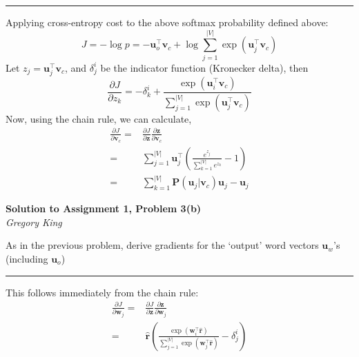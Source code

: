 \documentclass[letter,12pt]{article}
\newcommand{\myhwtitle}[3]
{\begin{center}
{\large {\bf Solution to Assignment {#1}, Problem {#2}}}\\
\medskip 
{\it {#3}} %
\end{center}}
\begin{document}
\noindent\rule{\textwidth}{0.4pt}\vspace{5mm}
Applying cross-entropy cost to the above softmax probability defined above:
\begin{equation}
J =-\log{p} = - {\boldsymbol u}_{o}^{\top}{\boldsymbol v}_{c} + \log\sum^{\vert{V}\vert}_{j=1}\exp{({\boldsymbol u}_{j}^{\top}{\boldsymbol v}_{c})}
\end{equation}
Let $z_{j}={\boldsymbol u}_{j}^{\top}{\boldsymbol v}_{c}$, and $\delta^{i}_{j}$ be the indicator function (Kronecker delta), then
\begin{equation}
\frac{\partial J}{\partial{z_{k}}} = - \delta^{i}_{k} + \frac{\exp{({\boldsymbol u}_{i}^{\top}{\boldsymbol v}_{c})}}{\sum^{\vert{V}\vert}_{j=1}\exp{({\boldsymbol u}_{j}^{\top}{\boldsymbol v}_{c})}}
\end{equation}
Now, using the chain rule, we can calculate,
\begin{align}
\frac{\partial J}{\partial{{\boldsymbol v}_{c}}} =&\frac{\partial J}{\partial{{\boldsymbol z}}}\frac{\partial{{\boldsymbol z}}}{\partial{{\boldsymbol v}_{c}}} \\
                                                                    =& \sum^{\vert{V}\vert}_{j=1}{\boldsymbol u}_{j}^{\top}\left(\frac{e^{z_{j}}}{\sum^{\vert{V}\vert}_{k=1}e^{z_{k}}} -  1\right) \\
                                                                    =&\sum^{\vert{V}\vert}_{k=1}{\boldsymbol P}({\boldsymbol u}_{j} \vert {\boldsymbol v}_{c} ){\boldsymbol u}_{j} - {\boldsymbol u}_{j}
\end{align}

\clearpage

\myhwtitle{1}{3(b)}{Gregory King}

\bigskip
\noindent As in the previous problem, derive gradients for the `output' word vectors ${\boldsymbol u}_{w}$'s (including ${\boldsymbol u}_{o}$)\vspace{5mm}
\noindent\rule{\textwidth}{0.4pt}\vspace{5mm}
This follows immediately from the chain rule:
\begin{align}
\frac{\partial J}{\partial{\boldsymbol w}_{j}} = &\frac{\partial J}{\partial{{\boldsymbol z}}}\frac{\partial{{\boldsymbol z}}}{\partial{\boldsymbol w}_{j}} \\
                                                                  = & \hat{\boldsymbol r}\left(\frac{\exp{({\boldsymbol w}^{\top}_{i}\hat{\boldsymbol r})}}{\sum^{\vert{V}\vert}_{j=1}\exp{({\boldsymbol w}^{\top}_{j}\hat{\boldsymbol r})}} - \delta^{i}_{j}\right)
\end{align}
\clearpage
\end{document}
